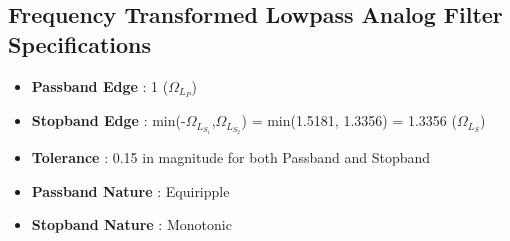 \documentclass[12pt]{article}
\begin{document}
\subsection{Frequency Transformed Lowpass Analog Filter Specifications}
\begin{itemize}
\item \textbf{Passband Edge} : 1 ($\Omega _{L_{P}}$)  
\item \textbf{Stopband Edge} : min(-$\Omega _{L_{S_{1}}}$,$\Omega _{L_{S_{2}}}$) = min(1.5181, 1.3356) = 1.3356 ($\Omega _{L_{S}}$)
\item \textbf{Tolerance} : 0.15 in magnitude for both Passband and Stopband
\item \textbf{Passband Nature} : Equiripple
\item \textbf{Stopband Nature} : Monotonic
\end{itemize}
\end{document}

